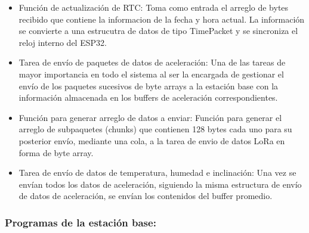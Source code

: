 \begin{itemize}
    \item Función de actualización de RTC: Toma como entrada el arreglo de bytes recibido que contiene la informacion de la fecha y hora actual. La información se convierte a una estrucutra de datos de tipo TimePacket y se sincroniza el reloj interno del ESP32.
    
    \item Tarea de envío de paquetes de datos de aceleración: Una de las tareas de mayor importancia en todo el sistema al ser la encargada de gestionar el envío de los paquetes sucesivos de byte arrays a la estación base con la información almacenada en los buffers de aceleración correspondientes. 
    
    \item Función para generar arreglo de datos a enviar: Función para generar el arreglo de subpaquetes (chunks) que contienen 128 bytes cada uno para su posterior envío, mediante una cola, a la tarea de envio de datos LoRa en forma de byte array.
    
    \item Tarea de envío de datos de temperatura, humedad e inclinación: Una vez se envían todos los datos de aceleración, siguiendo la misma estructura de envío de datos de aceleración, se envían los contenidos del buffer promedio.
    
\end{itemize}


\subsubsection{Programas de la estación base:}


